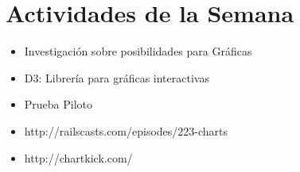\section{Actividades de la Semana}


\begin{itemize}
	\item Investigación sobre posibilidades para Gráficas
	\item D3: Librería para gráficas interactivas 
	\item Prueba Piloto
	\item http://railscasts.com/episodes/223-charts
	\item http://chartkick.com/	
\end{itemize}
